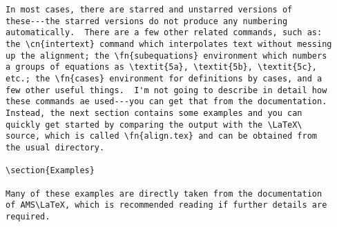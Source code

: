\documentclass[a4paper]{article}
\newcommand{\fn}[1]{\texttt{#1}}
\newcommand{\cn}[1]{\texttt{\char92 #1}}
\begin{document}
\begin{verbatim}
In most cases, there are starred and unstarred versions of
these---the starred versions do not produce any numbering
automatically.  There are a few other related commands, such as:
the \cn{intertext} command which interpolates text without messing
up the alignment; the \fn{subequations} environment which numbers
a groups of equations as \textit{5a}, \textit{5b}, \textit{5c},
etc.; the \fn{cases} environment for definitions by cases, and a
few other useful things.  I'm not going to describe in detail how
these commands ae used---you can get that from the documentation.
Instead, the next section contains some examples and you can
quickly get started by comparing the output with the \LaTeX\
source, which is called \fn{align.tex} and can be obtained from
the usual directory.

\section{Examples}

Many of these examples are directly taken from the documentation
of AMS\LaTeX, which is recommended reading if further details are
required.


\end{verbatim}
\end{document}
